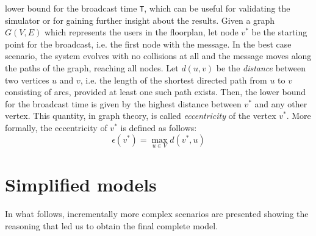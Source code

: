 lower bound for the broadcast time \texttt{T}, which can be useful for validating the simulator or for gaining further insight about the results. Given a graph $G(V, E)$ which represents the users
in the floorplan, let node $v^{*}$ be the starting point for the broadcast, i.e.
the first node with the message. In the best case scenario, the system evolves
with no collisions at all and the message moves along the paths of the graph,
reaching all nodes. Let $d(u, v)$ be the \textit{distance} between two vertices
$u$ and $v$, i.e. the length of the shortest directed path from $u$ to $v$
consisting of arcs, provided at least one such path exists. Then, the lower
bound for the broadcast time is given by the highest distance between $v^{*}$
and any other vertex. This quantity, in graph theory, is called
\textit{eccentricity} of the vertex $v^{*}$. More formally, the eccentricity of
$v^{*}$ is defined as follows:
\begin{equation}
\epsilon(v^{*}) = \max_{u{\in}V} d(v^{*}, u)
\end{equation}
\section{Simplified models}
In what follows, incrementally more complex scenarios are presented showing the
reasoning that led us to obtain the final complete model.
